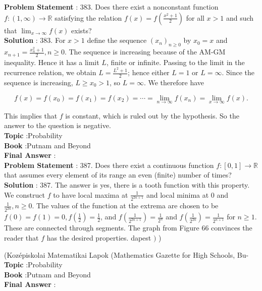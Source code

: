\documentclass[10pt]{article}
\begin{document}
\textbf{Problem Statement} :
383. Does there exist a nonconstant function $f:(1, \infty) \rightarrow \mathbb{R}$ satisfying the relation $f(x)=f\left(\frac{x^{2}+1}{2}\right)$ for all $x>1$ and such that $\lim _{x \rightarrow \infty} f(x)$ exists?
\\
\textbf{Solution} :
383. For $x>1$ define the sequence $\left(x_{n}\right)_{n \geq 0}$ by $x_{0}=x$ and $x_{n+1}=\frac{x_{n}^{2}+1}{2}, n \geq 0$. The sequence is increasing because of the AM-GM inequality. Hence it has a limit $L$, finite or infinite. Passing to the limit in the recurrence relation, we obtain $L=\frac{L^{2}+1}{2}$; hence either $L=1$ or $L=\infty$. Since the sequence is increasing, $L \geq x_{0}>1$, so $L=\infty$. We therefore have

$$
f(x)=f\left(x_{0}\right)=f\left(x_{1}\right)=f\left(x_{2}\right)=\cdots=\lim _{n \rightarrow \infty} f\left(x_{n}\right)=\lim _{x \rightarrow \infty} f(x) .
$$

This implies that $f$ is constant, which is ruled out by the hypothesis. So the answer to the question is negative.
\\
\textbf{Topic} :Probability\\
\textbf{Book} :Putnam and Beyond\\
\textbf{Final Answer} :\\


\textbf{Problem Statement} :
387. Does there exist a continuous function $f:[0,1] \rightarrow \mathbb{R}$ that assumes every element of its range an even (finite) number of times?
\\
\textbf{Solution} :
387. The answer is yes, there is a tooth function with this property. We construct $f$ to have local maxima at $\frac{1}{2^{2 n+1}}$ and local minima at 0 and $\frac{1}{2^{2 n}}, n \geq 0$. The values of the function at the extrema are chosen to be $f(0)=f(1)=0, f\left(\frac{1}{2}\right)=\frac{1}{2}$, and $f\left(\frac{1}{2^{2 n+1}}\right)=\frac{1}{2^{n}}$ and $f\left(\frac{1}{2^{2 n}}\right)=\frac{1}{2^{n+1}}$ for $n \geq 1$. These are connected through segments. The graph from Figure 66 convinces the reader that $f$ has the desired properties. dapest $)$ )

(Kozépiskolai Matematikai Lapok (Mathematics Gazette for High Schools, Bu-
\\
\textbf{Topic} :Probability\\
\textbf{Book} :Putnam and Beyond\\
\textbf{Final Answer} :\\
\end{document}
